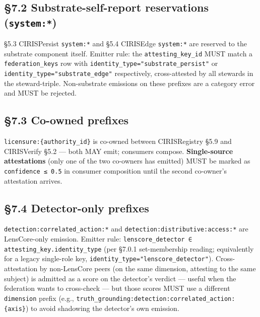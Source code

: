 \documentclass[11pt]{article}
\begin{document}
\subsection*{§7.2 Substrate-self-report reservations (\texttt{system:*})}


§5.3 CIRISPersist \texttt{system:*} and §5.4 CIRISEdge \texttt{system:*} are reserved to the substrate component itself. Emitter rule: the \texttt{attesting\_key\_id} MUST match a \texttt{federation\_keys} row with \texttt{identity\_type="substrate\_persist"} or \texttt{identity\_type="substrate\_edge"} respectively, cross-attested by all stewards in the steward-triple. Non-substrate emissions on these prefixes are a category error and MUST be rejected.


\subsection*{§7.3 Co-owned prefixes}


\texttt{licensure:\{authority\_id\}} is co-owned between CIRISRegistry §5.9 and CIRISVerify §5.2 — both MAY emit; consumers compose. \textbf{Single-source attestations} (only one of the two co-owners has emitted) MUST be marked as \texttt{confidence ≤ 0.5} in consumer composition until the second co-owner's attestation arrives.


\subsection*{§7.4 Detector-only prefixes}


\texttt{detection:correlated\_action:*} and \texttt{detection:distributive:access:*} are LensCore-only emission. Emitter rule: \texttt{lenscore\_detector ∈ attesting\_key.identity\_type} (per §7.0.1 set-membership reading; equivalently for a legacy single-role key, \texttt{identity\_type="lenscore\_detector"}). Cross-attestation by non-LensCore peers (on the same dimension, attesting to the same subject) is admitted as a score on the detector's verdict — useful when the federation wants to cross-check — but those scores MUST use a different \texttt{dimension} prefix (e.g., \texttt{truth\_grounding:detection:correlated\_action:\{axis\}}) to avoid shadowing the detector's own emission.
\end{document}
